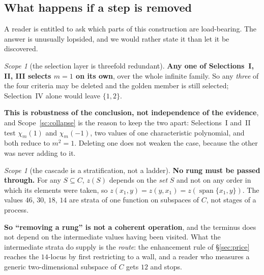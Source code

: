 \documentclass[11pt,reqno]{amsart}
\theoremstyle{plain}
\theoremstyle{definition}
\theoremstyle{remark}
\newtheorem{scope}[theorem]{Scope}
\begin{document}
\subsection{What happens if a step is removed}\label{sec:removal}

A reader is entitled to ask which parts of this construction are load-bearing. The answer
is unusually lopsided, and we would rather state it than let it be discovered.

\begin{scope}[the selection layer is threefold redundant]\label{sc:redundant}
\textbf{Any one of Selections~I, II, III selects $m=1$ on its own}, over the whole
infinite family. So any \emph{three} of the four criteria may be deleted and the golden
member is still selected; Selection~IV alone would leave $\{1,2\}$.

\textbf{This is robustness of the conclusion, not independence of the evidence}, and
Scope~\ref{sc:collapse} is the reason to keep the two apart: Selections~I and~II test
$\chi_m(1)$ and $\chi_m(-1)$, two values of one characteristic polynomial, and both
reduce to $m^2=1$. Deleting one does not weaken the case, because the other was never
adding to it.
\end{scope}

\begin{scope}[the cascade is a stratification, not a ladder]\label{sc:notaladder}
\textbf{No rung must be passed through.} For any $S\subseteq C$, $z(S)$ depends on the
\emph{set} $S$ and not on any order in which its elements were taken, so
$z(x_1,y)=z(y,x_1)=z(\operatorname{span}\{x_1,y\})$. The values $46$, $30$, $18$, $14$
are strata of one function on subspaces of $C$, not stages of a process.

\textbf{So ``removing a rung'' is not a coherent operation}, and the terminus does not
depend on the intermediate values having been visited. What the intermediate strata do
supply is the \emph{route}: the enhancement rule of \S\ref{sec:price} reaches the
$14$-locus by first restricting to a wall, and a reader who measures a generic
two-dimensional subspace of $C$ gets $12$ and stops.
\end{scope}
\end{document}
